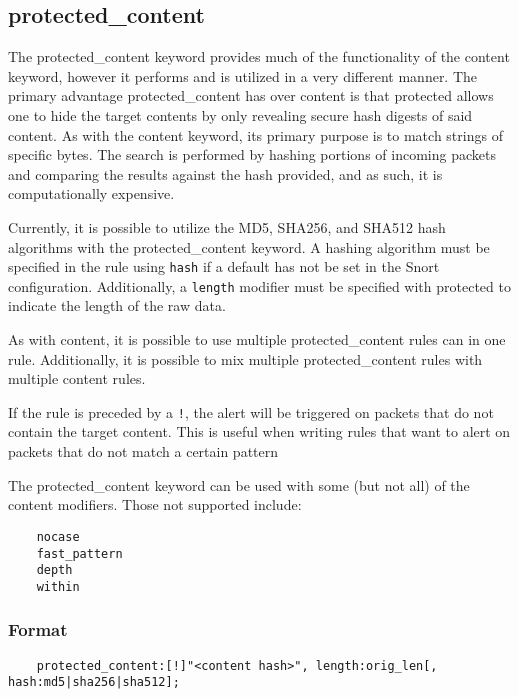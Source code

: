 \documentclass[english]{report}
\newenvironment{note}{
\samepage
    \vspace{10pt}{\textsf{
        {\hspace{7pt}\Huge{$\triangle$\hspace{-12.5pt}{\Large{$^!$}}}}\hspace{5pt}
        {\Large{NOTE}}
    }
    }
   \begin{center}
    \par\vspace{-17pt}

    \begin{lrbox}{\savepar}
    \begin{minipage}[r]{6in}
}
{
    \end{minipage}
    \end{lrbox}
    \fbox{
        \usebox{
            \savepar
	}
    }
    \par\vskip10pt
    \end{center}
}
\newenvironment{note}{
        \begin{rawhtml}
        <p><table border="1"><tr><td><b>
        Note:&nbsp;&nbsp;</b>
        \end{rawhtml}
}{
        \begin{rawhtml}
        </b></td></tr></table></p>
        \end{rawhtml}
}
\begin{document}
\subsection{protected\_content}
\label{sub:protectedcontent}

The protected\_content keyword provides much of the functionality of the content keyword, however it performs and is utilized in a very different manner. The primary advantage protected\_content has over content is that protected allows one to hide the target contents by only revealing secure hash digests of said content. As with the content keyword, its primary purpose is to match strings of specific bytes. The search is performed by hashing portions of incoming packets and comparing the results against the hash provided, and as such, it is computationally expensive.

Currently, it is possible to utilize the MD5, SHA256, and SHA512 hash algorithms with the protected\_content keyword. A hashing algorithm must be specified in the rule using \texttt{hash} if a default has not be set in the Snort configuration. Additionally, a \texttt{length} modifier must be specified with protected to indicate the length of the raw data.

As with content, it is possible to use multiple protected\_content rules can in one rule. Additionally, it is possible to mix multiple protected\_content rules with multiple content rules.

If the rule is preceded by a \texttt{!}, the alert will be triggered on packets
that do not contain the target content. This is useful when writing rules that want
to alert on packets that do not match a certain pattern

\begin{note}

The protected\_content keyword can be used with some (but not all) of the content modifiers. Those not supported include:
\begin{verbatim}
	nocase
	fast_pattern
	depth
	within
\end{verbatim}

\end{note}

\subsubsection{Format}

\begin{verbatim}
    protected_content:[!]"<content hash>", length:orig_len[, hash:md5|sha256|sha512];
\end{verbatim}
\end{document}
